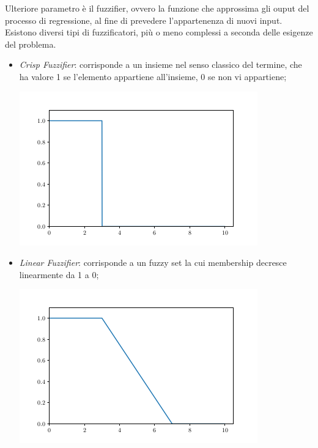 \documentclass[12pt,a4paper]{report}
\begin{document}
Ulteriore parametro è il fuzzifier, ovvero la funzione che approssima gli ouput del processo di regressione, al fine di prevedere l'appartenenza di nuovi input. Esistono diversi tipi di fuzzificatori, più o meno complessi a seconda delle esigenze del problema.
\begin{itemize}
\item \emph{Crisp Fuzzifier}: corrisponde a un insieme nel senso classico del termine, che ha valore 1 se l'elemento appartiene all'insieme, 0 se non vi appartiene;

\begin{minipage}{\linewidth}
	\centering
      \includegraphics[width=0.8\linewidth]{images/crispFuzzifier.png}
\end{minipage}

\item \emph{Linear Fuzzifier}: corrisponde a un fuzzy set la cui membership decresce linearmente da 1 a 0;


\begin{minipage}{\linewidth}
	\centering
      \includegraphics[width=0.8\linewidth]{images/linearFuzzifier.png}
\end{minipage}


\end{itemize}
\end{document}
